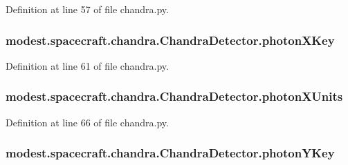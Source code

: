 Definition at line 57 of file chandra.\+py.

\subsubsection[{\texorpdfstring{photon\+X\+Key}{photonXKey}}]{\setlength{\rightskip}{0pt plus 5cm}modest.\+spacecraft.\+chandra.\+Chandra\+Detector.\+photon\+X\+Key}\hypertarget{classmodest_1_1spacecraft_1_1chandra_1_1ChandraDetector_a9368465ea944d450b607cd256c9ca265}{}\label{classmodest_1_1spacecraft_1_1chandra_1_1ChandraDetector_a9368465ea944d450b607cd256c9ca265}


Definition at line 61 of file chandra.\+py.

\subsubsection[{\texorpdfstring{photon\+X\+Units}{photonXUnits}}]{\setlength{\rightskip}{0pt plus 5cm}modest.\+spacecraft.\+chandra.\+Chandra\+Detector.\+photon\+X\+Units}\hypertarget{classmodest_1_1spacecraft_1_1chandra_1_1ChandraDetector_a95236fdcc4372f2a3af51536b1be6ece}{}\label{classmodest_1_1spacecraft_1_1chandra_1_1ChandraDetector_a95236fdcc4372f2a3af51536b1be6ece}


Definition at line 66 of file chandra.\+py.

\subsubsection[{\texorpdfstring{photon\+Y\+Key}{photonYKey}}]{\setlength{\rightskip}{0pt plus 5cm}modest.\+spacecraft.\+chandra.\+Chandra\+Detector.\+photon\+Y\+Key}\hypertarget{classmodest_1_1spacecraft_1_1chandra_1_1ChandraDetector_af59eb340da4b61a41631801d2510246b}{}\label{classmodest_1_1spacecraft_1_1chandra_1_1ChandraDetector_af59eb340da4b61a41631801d2510246b}


